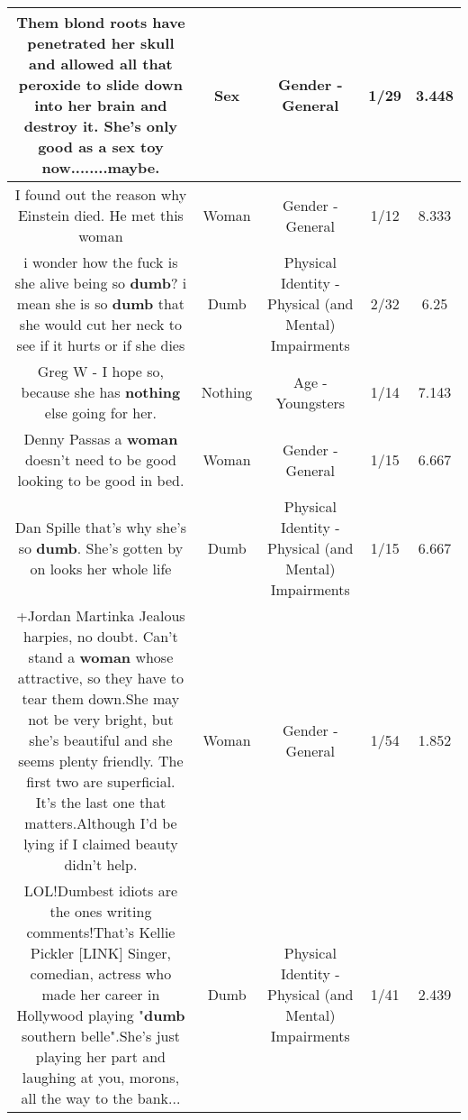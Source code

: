 \documentclass[11pt]{article}
\newlength\mylength
\begin{document}
\begin{center}
\begin{longtable}{|C{.65\mylength}|C{.30\mylength}|C{.12\mylength}|C{.12\mylength}|C{.12\mylength}|}
  \small Them blond roots have penetrated her skull and allowed all that peroxide to slide down into her brain and destroy it. She's only good as a \textbf{sex} toy now........maybe.\normalsize   & Sex & Gender - General & 1/29 & 3.448 \\  \hline
  \small I found out the reason why Einstein died. He met this woman\normalsize   & Woman & Gender - General & 1/12 & 8.333 \\  \hline
  \small i wonder how the fuck is she alive being so \textbf{dumb}? i mean she is so \textbf{dumb} that she would cut her neck to see if it hurts or if she dies\normalsize   & Dumb & Physical Identity - Physical (and Mental) Impairments & 2/32 & 6.25 \\  \hline
  \small Greg W
 - I hope so, because she has \textbf{nothing} else going for her.\normalsize   & Nothing & Age - Youngsters & 1/14 & 7.143 \\  \hline
  \small Denny Passas a \textbf{woman} doesn't  need to be good looking to be good in bed.\normalsize   & Woman & Gender - General & 1/15 & 6.667 \\  \hline
  \small Dan Spille that's why she's so \textbf{dumb}. She's gotten by on looks her whole life\normalsize   & Dumb & Physical Identity - Physical (and Mental) Impairments & 1/15 & 6.667 \\  \hline
  \small +Jordan Martinka Jealous harpies, no doubt. Can't stand a \textbf{woman} whose attractive, so they have to tear them down.She may not be very bright, but she's beautiful and she seems plenty friendly. The first two are superficial. It's the last one that matters.Although I'd be lying if I claimed beauty didn't help.\normalsize   & Woman & Gender - General & 1/54 & 1.852 \\  \hline
  \small LOL!Dumbest idiots are the ones writing comments!That's Kellie Pickler [LINK] Singer, comedian, actress who made her career in Hollywood  playing "\textbf{dumb} southern belle".She's just playing her part and laughing at you, morons, all the way to the bank...\normalsize   & Dumb & Physical Identity - Physical (and Mental) Impairments & 1/41 & 2.439 \\  \hline

\end{longtable}
\end{center}
\end{document}
